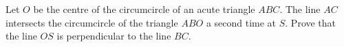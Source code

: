 Let $O$ be the centre of the circumcircle of an acute triangle $ABC$.
The line $AC$ intersects the circumcircle of the triangle $ABO$ a second time at $S$.
Prove that the line $OS$ is perpendicular to the line $BC$.

